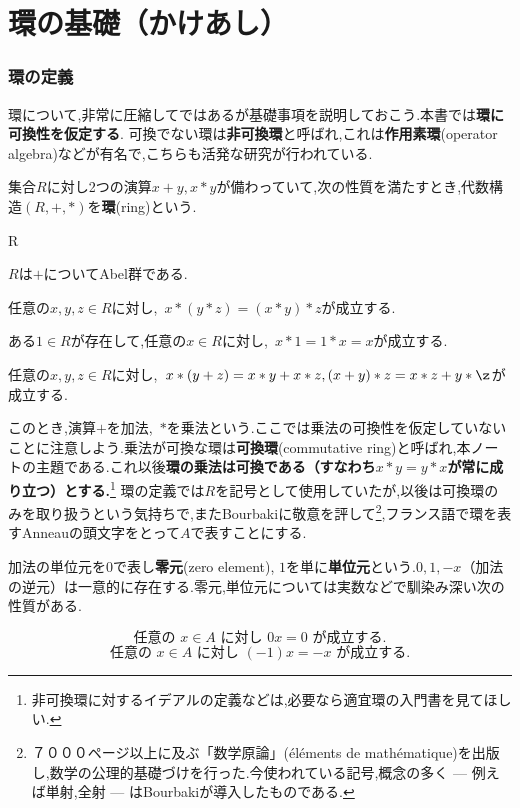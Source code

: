 \setcounter{part}{-1}
\part[Definition of Ring and more...]{環の基礎（かけあし）}
\section{環の定義}

環について,非常に圧縮してではあるが基礎事項を説明しておこう.本書では\textbf{環に可換性を仮定する}. 可換でない環は\textbf{非可換環}と呼ばれ,これは\textbf{作用素環}(operator algebra)などが有名で,こちらも活発な研究が行われている.
\begin{defi}[環]
	集合$R$に対し2つの演算$x+y,x*y$が備わっていて,次の性質を満たすとき,代数構造$(R,+,*)$を\textbf{環}(ring)という.
	\begin{defiterm}{R}
		\item $R$は$+$についてAbel群である.
		\item 任意の$x,y,z\in R$に対し,~$x*(y*z)=(x*y)*z$が成立する.
		\item ある$1\in R$が存在して,任意の$x\in R$に対し,~$x*1=1*x=x$が成立する.
		\item 任意の$x,y,z\in R$に対し,~$x*(y+z)=x*y+x*z,(x+y)*z=x*z+y*\z$が成立する.
	\end{defiterm}
\end{defi}

このとき,演算$+$を加法,~$*$を乗法という.ここでは乗法の可換性を仮定していないことに注意しよう.乗法が可換な環は\textbf{可換環}(commutative ring)と呼ばれ,本ノートの主題である.これ以後\textbf{環の乗法は可換である（すなわち$x*y=y*x$が常に成り立つ）とする.}\footnote{非可換環に対するイデアルの定義などは,必要なら適宜環の入門書を見てほしい.} 環の定義では$R$を記号として使用していたが,以後は可換環のみを取り扱うという気持ちで,またBourbakiに敬意を評して\footnote{７０００ページ以上に及ぶ「数学原論」(\'el\'ements de math\'ematique)を出版し,数学の公理的基礎づけを行った.今使われている記号,概念の多く --- 例えば単射,全射 --- はBourbakiが導入したものである.},フランス語で環を表すAnneauの頭文字をとって$A$で表すことにする.

加法の単位元を$0$で表し\textbf{零元}(zero element), $1$を単に\textbf{単位元}という.$0,1,-x$（加法の逆元）は一意的に存在する.零元,単位元については実数などで馴染み深い次の性質がある.

\[\text{任意の }x\in A\text{ に対し }0x=0\text{ が成立する.}\]
\[\text{任意の }x\in A\text{ に対し }(-1)x=-x\text{ が成立する.}\]

